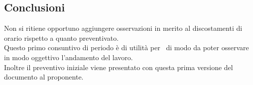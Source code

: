 	\subsection{Conclusioni}
	Non si ritiene opportuno aggiungere osservazioni in merito al discostamenti di orario rispetto a quanto preventivato.\\
	Questo primo consuntivo di periodo è di utilità per \gruppo\ di modo da poter osservare in modo oggettivo l'andamento del lavoro.\\
	Inoltre il preventivo iniziale viene presentato con questa prima versione del documento al proponente.
	